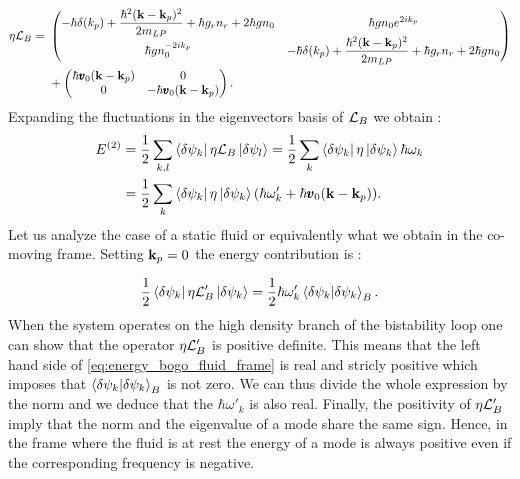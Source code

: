 \begin{equation}
    \begin{aligned}
    \eta\mathcal{L}_B = \ &
    \begin{pmatrix}
        -\hbar\delta(k_p)+\dfrac{\hbar^2(\mathbf{k}-\mathbf{k}_p)^2}{2m_{LP}}+\hbar g_rn_r + 2\hbar g n_0 &  \hbar g n_0e^{2ik_p} \\
        \hbar g n_0^{-2ik_p} & -\hbar\delta(k_p)+\dfrac{\hbar^2(\mathbf{k}-\mathbf{k}_p)^2}{2m_{LP}}+\hbar g_rn_r + 2\hbar g n_0
    \end{pmatrix}\\
    &+\begin{pmatrix}
        \hbar \pmb{v}_0(\mathbf{k}-\mathbf{k}_p) & 0 \\
        0 & -\hbar \pmb{v}_0(\mathbf{k}-\mathbf{k}_p)
    \end{pmatrix}.
    \end{aligned}
\end{equation}
Expanding the fluctuations in the eigenvectors basis of $\mathcal{L}_B$ we obtain :
\begin{equation}
    \begin{aligned}
    E^{(2)} &= \dfrac{1}{2}\sum_{k,l}\bra{\delta\psi_k}\eta\mathcal{L}_B\ket{\delta\psi_l}=\dfrac{1}{2}\sum_k\bra{\delta\psi_k}\eta\ket{\delta\psi_k}\hbar\omega_k \\
    &=\dfrac{1}{2}\sum_k\bra{\delta\psi_k}\eta\ket{\delta\psi_k}(\hbar\omega'_k+\hbar \pmb{v}_0(\mathbf{k}-\mathbf{k}_p)).
    \end{aligned}
    \label{eq:energy_bogo_lab_frame}
\end{equation}
Let us analyze the case of a static fluid or equivalently what we obtain in the co-moving frame. Setting $\mathbf{k}_p=0$ the energy contribution is :

\begin{equation}
    \dfrac{1}{2}\bra{\delta\psi_k}\eta\mathcal{L}_B'\ket{\delta\psi_k} =\dfrac{1}{2}\hbar\omega'_k\bra{\delta\psi_k}\ket{\delta\psi_k}_B.
    \label{eq:energy_bogo_fluid_frame}
\end{equation}
When the system operates on the high density branch of the bistability loop one can show that the operator $\eta\mathcal{L}_B'$ is positive definite.
This means that the left hand side of \autoref{eq:energy_bogo_fluid_frame} is real and stricly positive which imposes 
that $\bra{\delta\psi_k}\ket{\delta\psi_k}_B$ is not zero. We can thus divide the whole expression by the norm and we deduce that the $\hbar\omega'_k$ is also real.
Finally, the positivity of $\eta\mathcal{L}_B'$ imply that the norm and the eigenvalue of a mode share the same sign. Hence,
in the frame where the fluid is at rest the energy of a mode is always positive even if the corresponding frequency is negative.

